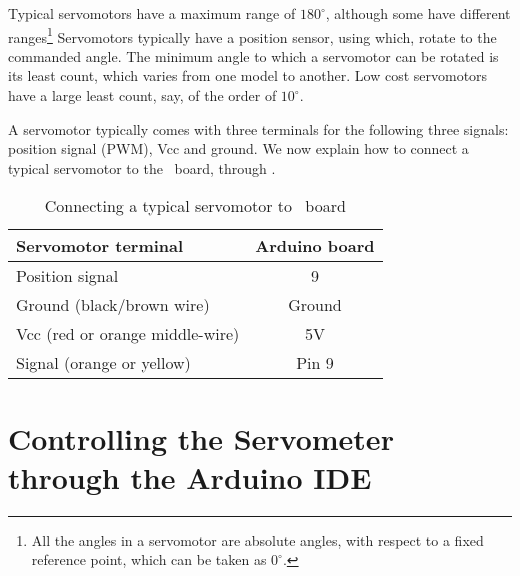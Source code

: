 Typical servomotors have a maximum range of $180^\circ$, although some
have different ranges\footnote{All the angles in a servomotor are
  absolute angles, with respect to a fixed reference point, which can
  be taken as $0^\circ$.}
Servomotors typically have a position sensor,
using which, rotate to the commanded angle.  The minimum angle to
which a servomotor can be rotated is its least count, which varies
from one model to another.  Low cost servomotors have a large least
count, say, of the order of $10^\circ$.

A servomotor typically comes with three terminals for the
following three signals: position signal (PWM), Vcc and ground.
We now explain how to connect a typical servomotor to the \arduino\
board, through .
\begin{table}
\centering
\caption{Connecting a typical servomotor to \arduino\ board}
\label{tab:servo-connect}
\begin{tabular}{lc}\hline
Servomotor terminal & Arduino board \\ \hline
Position signal & 9 \\
Ground (black/brown wire) & Ground \\ 
Vcc (red or orange middle-wire) & 5V \\
Signal (orange or yellow) & Pin 9 \\ \hline
\end{tabular}
\end{table}

\section{Controlling the Servometer through the Arduino IDE}
